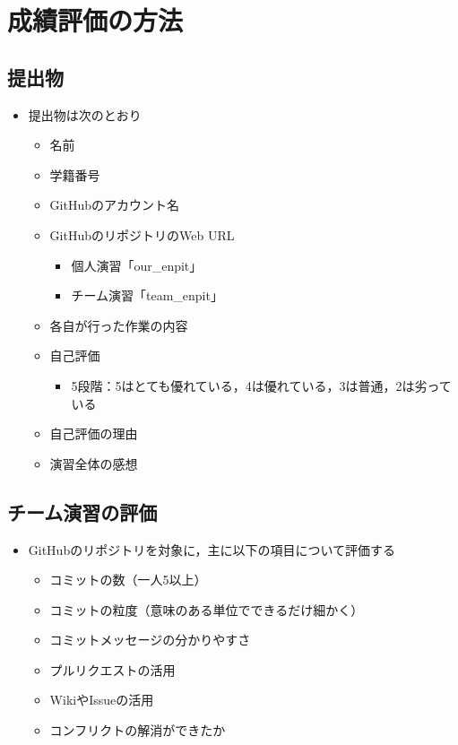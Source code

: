 \documentclass[a4paper,twoside,twocolumn]{bxjsarticle}
\begin{document}
\section{成績評価の方法}
\label{sec-5}
\subsection{提出物}
\label{sec-5-1}
\begin{itemize}
\item 提出物は次のとおり
\begin{itemize}
\item 名前
\item 学籍番号
\item GitHubのアカウント名
\item GitHubのリポジトリのWeb URL
\begin{itemize}
\item 個人演習「our\_enpit」
\item チーム演習「team\_enpit」
\end{itemize}
\item 各自が行った作業の内容
\item 自己評価
\begin{itemize}
\item 5段階：5はとても優れている，4は優れている，3は普通，2は劣っている
\end{itemize}
\item 自己評価の理由
\item 演習全体の感想
\end{itemize}
\end{itemize}

\subsection{チーム演習の評価}
\label{sec-5-2}
\begin{itemize}
\item GitHubのリポジトリを対象に，主に以下の項目について評価する
\begin{itemize}
\item コミットの数（一人5以上）
\item コミットの粒度（意味のある単位でできるだけ細かく）
\item コミットメッセージの分かりやすさ
\item プルリクエストの活用
\item WikiやIssueの活用
\item コンフリクトの解消ができたか
\end{itemize}
\end{itemize}
\end{document}
